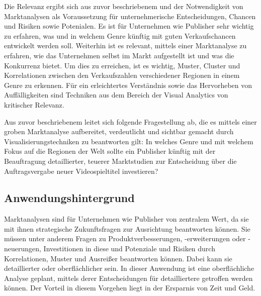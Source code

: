 \documentclass[usegeometry=true]{scrartcl}
\begin{document}
Die Relevanz ergibt sich aus zuvor beschriebenem und der Notwendigkeit von Marktanalysen als Voraussetzung für unternehmerische Entscheidungen, Chancen und Risiken sowie Potenialen.\cite{Fleig.2020}
Es ist für Unternehmen wie Publisher sehr wichtig zu erfahren, was und in welchem Genre künftig mit guten Verkaufschancen entwickelt werden soll.
Weiterhin ist es relevant, mittels einer Marktanalyse zu erfahren, wie das Unternehmen selbst im Markt aufgestellt ist und was die Konkurrenz bietet. 
Um dies zu erreichen, ist es wichtig, Muster, Cluster und Korrelationen zwischen den Verkaufszahlen verschiedener Regionen in einem Genre zu erkennen. 
Für ein erleichtertes Verständnis sowie das Hervorheben von Auffälligkeiten sind Techniken aus dem Bereich der Visual Analytics von kritischer Relevanz.

Aus zuvor beschriebenem leitet sich folgende Fragestellung ab, die es mittels einer groben Marktanalyse aufbereitet, verdeutlicht und sichtbar gemacht durch Visualisierungstechniken zu beantworten gilt:
In welches Genre und mit welchem Fokus auf die Regionen der Welt sollte ein Publisher künftig mit der Beauftragung detaillierter, teuerer Marktstudien zur Entscheidung über die Auftragsvergabe neuer Videospieltitel investieren?

\subsection{Anwendungshintergrund}
Marktanalysen sind für Unternehmen wie Publisher von zentralem Wert, da sie mit ihnen strategische Zukunftsfragen zur Ausrichtung beantworten können. 
Sie müssen unter anderem Fragen zu Produktverbesserungen, -erweiterungen oder -neuerungen, Investitionen in diese und Potenziale und Risiken durch Korrelationen, Muster und Ausreißer beantworten können.\cite{Fleig.2020}
Dabei kann sie detaillierter oder oberflächlicher sein. In dieser Anwendung ist eine oberflächliche Analyse geplant, mittels derer Entscheidungen für detailliertere getroffen werden können.
Der Vorteil in diesem Vorgehen liegt in der Ersparnis von Zeit und Geld. 
\end{document}
